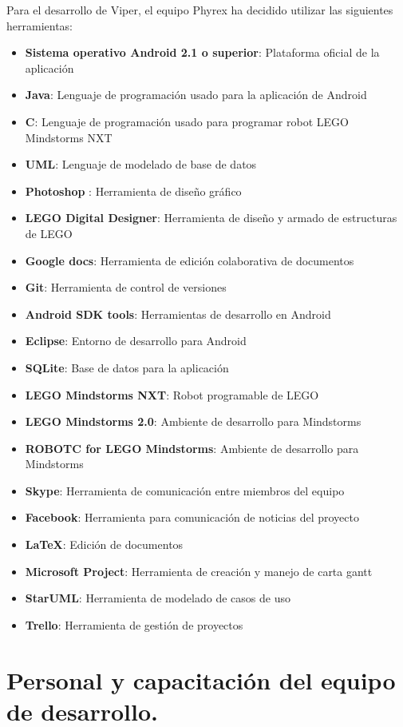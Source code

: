 Para el desarrollo de Viper, el equipo Phyrex ha decidido utilizar las siguientes herramientas:

\begin{itemize}
    \item {\bf Sistema operativo Android 2.1 o superior}: Plataforma oficial de la aplicaci\'on
    \item {\bf Java}: Lenguaje de programaci\'on usado para la aplicaci\'on de Android
    \item {\bf C}: Lenguaje de programaci\'on usado para programar robot LEGO Mindstorms NXT
    \item {\bf UML}: Lenguaje de modelado de base de datos
    \item {\bf Photoshop }: Herramienta de dise\~no gr\'afico
    \item {\bf LEGO Digital Designer}: Herramienta de dise\~no y armado de estructuras de LEGO
    \item {\bf Google docs}: Herramienta de edici\'on colaborativa de documentos
    \item {\bf Git}: Herramienta de control de versiones
    \item {\bf Android SDK tools}: Herramientas de desarrollo en Android
    \item {\bf Eclipse}: Entorno de desarrollo para Android
    \item {\bf SQLite}: Base de datos para la aplicaci\'on
    \item {\bf LEGO Mindstorms NXT}: Robot programable de LEGO
    \item {\bf LEGO Mindstorms 2.0}: Ambiente de desarrollo para Mindstorms
    \item {\bf ROBOTC for LEGO Mindstorms}: Ambiente de desarrollo para Mindstorms
    \item {\bf Skype}: Herramienta de comunicaci\'on entre miembros del equipo
    \item {\bf Facebook}: Herramienta para comunicaci\'on de noticias del proyecto
    \item {\bf \LaTeX}: Edici\'on de documentos
    \item {\bf Microsoft Project}: Herramienta de creaci\'on y manejo de carta gantt
    \item {\bf StarUML}: Herramienta de modelado de casos de uso
    \item {\bf Trello}: Herramienta de gesti\'on de proyectos
\end{itemize}

\newpage
\section{Personal y capacitaci\'on del equipo de desarrollo.}

